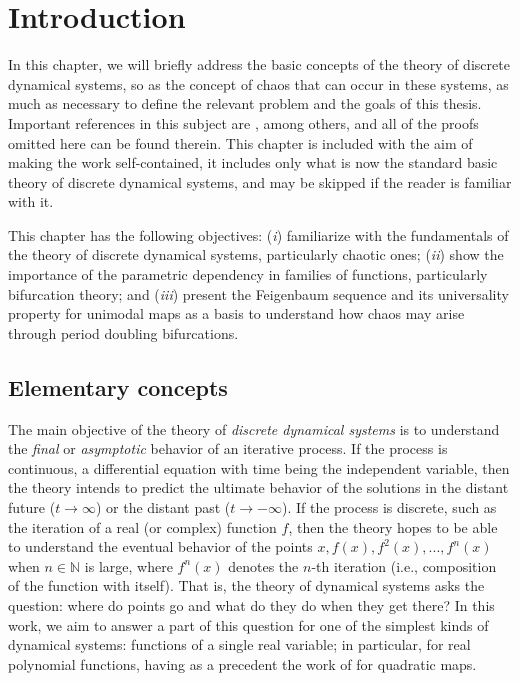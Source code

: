 \documentclass[10pt,twoside,titlepage]{book}
\numberwithin{equation}{chapter}
\numberwithin{figure}{chapter}
\numberwithin{table}{chapter}
\theoremstyle{plain}%
\theoremstyle{definition}
\theoremstyle{remark}
\begin{document}
\chapter{Introduction}
\label{cha:Intro}

In this chapter, we will briefly address the basic concepts of the theory of discrete dynamical systems, so as the concept of chaos that can occur in these systems, as much as necessary to define the relevant problem and the goals of this thesis. Important references in this subject are \cite{DevaneyIntroCDD,Holmgren,Elaydi}, among others, and all of the proofs omitted here can be found therein. This chapter is included with the aim of making the work self-contained, it includes only what is now the standard basic theory of discrete dynamical systems, and may be skipped if the reader is familiar with it.

This chapter has the following objectives: (\emph{i}) familiarize with the fundamentals of the theory of discrete dynamical systems, particularly chaotic ones; (\emph{ii}) show the importance of the parametric dependency in families of functions, particularly bifurcation theory; and (\emph{iii}) present the Feigenbaum sequence and its universality property for unimodal maps as a basis to understand how chaos may arise through period doubling bifurcations.

\section{Elementary concepts}

The main objective of the theory of \emph{discrete dynamical systems} is to understand the \emph{final} or \emph{asymptotic} behavior of an iterative process. If the process is continuous, a differential equation with time being the independent variable, then the theory intends to predict the ultimate behavior of the solutions in the distant future ($t\rightarrow\infty$) or the distant past ($t\rightarrow-\infty$). If the process is discrete, such as the iteration of a real (or complex) function $f$, then the theory hopes to be able to understand the eventual behavior of the points  $x,f(x),f^{2}(x),...,f^{n}(x)$ when $n\in\mathbb{N}$ is large, where $f^{n}(x)$ denotes the $n$-th iteration (i.e., composition of the function with itself). That is, the theory of dynamical systems asks the question: where do points go and what do they do when they get there? In this work, we aim to answer a part of this question for one of the simplest kinds of dynamical systems: functions of a single real variable; in particular, for real polynomial functions, having as a precedent the work of \cite{Solis2004} for quadratic maps.
\end{document}

